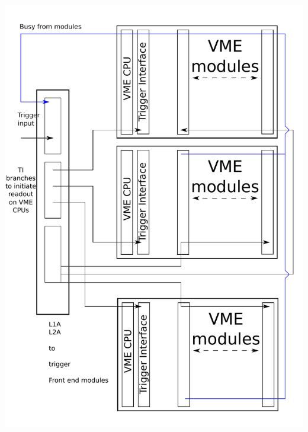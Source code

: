\documentclass{article}
\begin{document}
\includegraphics[scale=0.55]{figs/TS.pdf}\\
\end{document}
